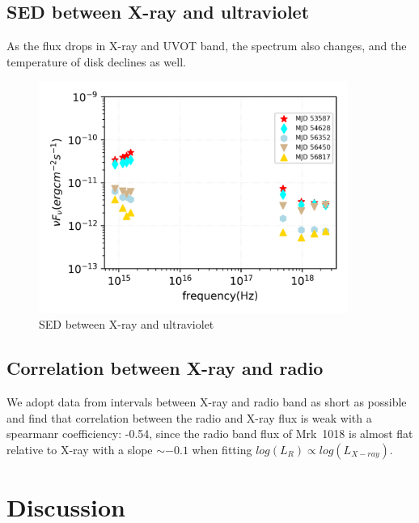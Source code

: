 \documentclass{aastex63}
\begin{document}
\subsection{SED between X-ray and ultraviolet}\label{subsec:xray-uvot-sed}
As the flux drops in X-ray and UVOT band, the spectrum also changes, and the temperature of disk declines as well.
\begin{figure}
\centering
	\includegraphics[width=0.9\textwidth]{./pic/Mrk1018_uvot_xray_sed.png}
    \caption{SED between X-ray and ultraviolet}
    \label{fig:xray-uvot-sed}
\end{figure}



\subsection{Correlation between X-ray and radio}\label{subsec:xray-radio}
We adopt data from intervals between X-ray and radio band as short as possible and find that correlation between the radio and X-ray flux is weak with a spearmanr coefficiency: -0.54, since the radio band flux of Mrk~1018 is almost flat relative to X-ray with a slope $\sim -0.1$ when fitting $log(L_{R})\propto log(L_{X-ray})$. 












\section{Discussion}\label{sec:discussion}
\end{document}
